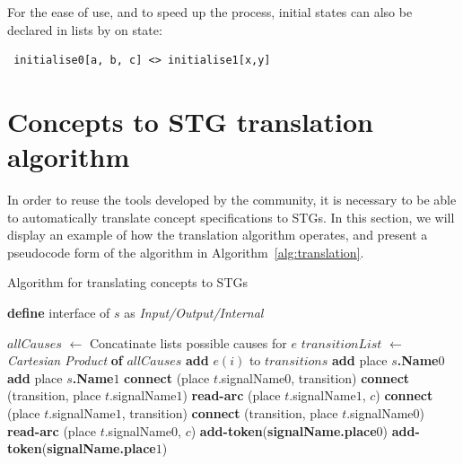 \documentclass[british,conference,compsoc]{IEEEtran}
\begin{document}
For the ease of use, and to speed up the process, initial states can also be 
declared in lists by on state:

\begin{verbatim}
 initialise0[a, b, c] <> initialise1[x,y]
\end{verbatim}

\vspace{-1mm}

\section{Concepts to STG translation algorithm\label{sec:algorithm}}

\vspace{-2mm}

In order to reuse the tools developed by the community, it is
necessary to be able to automatically translate concept specifications to STGs.
In this section, we will display an example of how the translation algorithm 
operates, and present a pseudocode form of the algorithm in 
Algorithm~\ref{alg:translation}. 

\begin{algorithm}[t]
\begin{algorithmic}
\caption{Algorithm for translating concepts to STGs\label{alg:translation}}
  \State \textbf{define} interface of $s$ as \emph{Input/Output/Internal}
\EndFor

  \State $allCauses$ $\leftarrow$ Concatinate lists  possible causes for $e$
  \State $transitionList$ $\leftarrow$ \emph{Cartesian Product} \textbf{of} 
	$allCauses$
    \State \textbf{add} $e(i)$ to $transitions$
  \EndFor 
\EndFor
{}
  \State \textbf{add} place \textbf{$s$.Name}$0$
  \State \textbf{add} place \textbf{$s$.Name}$1$
\EndFor
{}
    \State \textbf{connect} (place $t$.signalName$0$, transition)
    \State \textbf{connect} (transition, place $t$.signalName$1$)
      \State \textbf{read-arc} (place $t$.signalName$1$, $c$)
    \EndFor
  \EndIf
    \State \textbf{connect} (place $t$.signalName$1$, transition)
    \State \textbf{connect} (transition, place $t$.signalName$0$)
      \State \textbf{read-arc} (place $t$.signalName$0$, $c$)
    \EndFor
  \EndIf
\EndFor
{}
    \State \textbf{add-token}(\textbf{signalName.place}$0$)
  \EndIf 
    \State \textbf{add-token}(\textbf{signalName.place}$1$)
  \EndIf
\EndFor
\end{algorithmic}
\end{algorithm}
\end{document}
